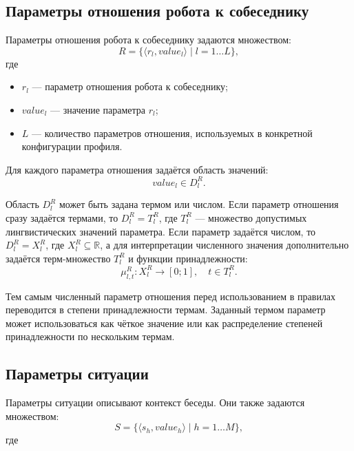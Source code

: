 \subsection*{Параметры отношения робота к собеседнику}

Параметры отношения робота к собеседнику задаются множеством:
\begin{equation}
	\label{eq:interlocutor_relation}
	R = \{\langle r_l, value_l \rangle \mid l = 1 \dots L\},
\end{equation}
где

\begin{itemize}
	\item \(r_l\) --- параметр отношения робота к собеседнику;
	\item \(value_l\) --- значение параметра \(r_l\);
	\item \(L\) --- количество параметров отношения, используемых в конкретной конфигурации профиля.
\end{itemize}

Для каждого параметра отношения задаётся область значений:
\begin{equation}
	\label{eq:relation_domain}
	value_l \in D^R_l.
\end{equation}

Область \(D^R_l\) может быть задана термом или числом.
Если параметр отношения сразу задаётся термами, то \(D^R_l = T^R_l\), где \(T^R_l\) --- множество допустимых лингвистических значений параметра.
Если параметр задаётся числом, то \(D^R_l = X^R_l\), где \(X^R_l \subseteq \mathbb{R}\), а для интерпретации численного значения дополнительно задаётся терм-множество \(T^R_l\) и функции принадлежности:
\begin{equation}
	\label{eq:relation_membership}
	\mu^R_{l,t}: X^R_l \rightarrow [0; 1], \quad t \in T^R_l.
\end{equation}

Тем самым численный параметр отношения перед использованием в правилах переводится в степени принадлежности термам.
Заданный термом параметр может использоваться как чёткое значение или как распределение степеней принадлежности по нескольким термам.

\subsection*{Параметры ситуации}

Параметры ситуации описывают контекст беседы.
Они также задаются множеством:
\begin{equation}
	\label{eq:situation_context}
	S = \{\langle s_h, value_h \rangle \mid h = 1 \dots M\},
\end{equation}
где

